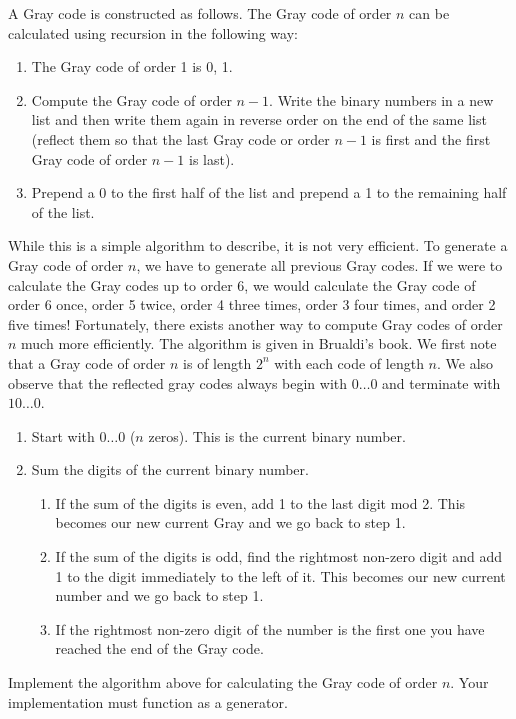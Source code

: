 A Gray code is constructed as follows.\cite{Brualdi2010}
The Gray code of order $n$ can be calculated using recursion in the following way:
\begin{enumerate}
\item The Gray code of order 1 is 0, 1.
\item Compute the Gray code of order $n-1$.  Write the binary numbers in a new list and then write them again in reverse order on the end of the same list (reflect them so that the last Gray code or order $n-1$ is first and the first Gray code of order $n-1$ is last).
\item Prepend a 0 to the first half of the list and prepend a 1 to the remaining half of the list.
\end{enumerate}
While this is a simple algorithm to describe, it is not very efficient.  
To generate a Gray code of order $n$, we have to generate all previous Gray codes.
If we were to calculate the Gray codes up to order 6, we would calculate the Gray code of order 6 once, order 5 twice, order 4 three times, order 3 four times, and order 2 five times!
Fortunately, there exists another way to compute Gray codes of order $n$ much more efficiently.
The algorithm is given in Brualdi's book.  
We first note that a Gray code of order $n$ is of length $2^n$ with each code of length $n$.
We also observe that the reflected gray codes always begin with $0\dots0$ and terminate with $10\dots0$.
\begin{enumerate}
\item Start with $0\dots0$ ($n$ zeros).  This is the current binary number.
\item Sum the digits of the current binary number.
\begin{enumerate}
\item If the sum of the digits is even, add 1 to the last digit mod 2.
This becomes our new current Gray and we go back to step 1.
\item If the sum of the digits is odd, find the rightmost non-zero digit and add 1 to the digit immediately to the left of it.
This becomes our new current number and we go back to step 1.
\item If the rightmost non-zero digit of the number is the first one you have reached the end of the Gray code.
\end{enumerate}
\end{enumerate}

\begin{problem}
\label{prob:brualdi_gray}
Implement the algorithm above for calculating the Gray code of order $n$.
Your implementation must function as a generator.
\end{problem}


